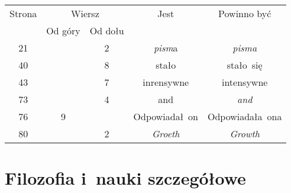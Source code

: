 \documentclass[a4paper,11pt]{article}
\begin{document}
\newpage



\begin{center}

  \begin{tabular}{|c|c|c|c|c|}
    \hline
    Strona & \multicolumn{2}{c|}{Wiersz} & Jest
                              & Powinno być \\ \cline{2-3}
    & Od góry & Od dołu & & \\
    \hline
    21  & &  2 & \textit{pism}a & \textit{pisma} \\
    40  & &  8 & stało & stało~się \\
    43  & &  7 & inrensywne & intensywne \\
    73  & &  4 & and & \textit{and} \\
    76  &  9 & & Odpowiadał~on & Odpowiadała~ona \\
    80  & &  2 & \textit{Groeth} & \textit{Growth} \\
    \hline
  \end{tabular}

\end{center}

\vspace{\spaceTwo}













\newpage

\section{Filozofia i~nauki szczegółowe}

\vspace{\spaceTwo}
\end{document}
